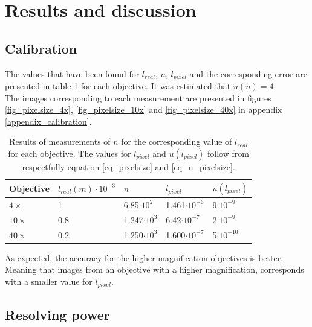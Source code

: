 \section{Results and discussion}
\subsection{Calibration}

The values that have been found for $l_{real}$, $n$, $l_{pixel}$ and the corresponding error are presented in table \ref{table_pixelsize} for each objective. It was estimated that $u(n) = 4$.\\
The images corresponding to each measurement are presented in figures \ref{fig_pixelsize_4x}, \ref{fig_pixelsize_10x} and \ref{fig_pixelsize_40x} in appendix \ref{appendix_calibration}.\\

\begin{table}[h!]
\centering
\captionsetup{font=small, justification = centering}
  \caption{Results of measurements of $n$ for the corresponding value of $l_{real}$ for each objective. The values for $l_{pixel}$ and $u(l_{pixel})$ follow from respectfully equation \ref{eq_pixelsize} and \ref{eq_u_pixelsize}.}
\begin{tabular}{|l|l|l|l|l|}
\hline

Objective & $l_{real} (m) \cdot 10^{-3}$ & $n$ & $l_{pixel}$ & $u(l_{pixel})$ \\ \hline
$4\times$ & 1 & 6.85$\cdot 10^2$ & 1.461$\cdot 10^{-6}$ & 9$\cdot 10^{-9}$\\
$10\times$ & 0.8 & 1.247$\cdot 10^3$ & 6.42$\cdot 10^{-7}$ & 2$\cdot 10^{-9}$ \\
$40\times$ & 0.2 & 1.250$\cdot 10^3$ & 1.600$\cdot 10^{-7}$ & 5$\cdot 10^{-10}$ \\ \hline
\end{tabular}

\label{table_pixelsize}
\end{table}
As expected, the accuracy for the higher magnification objectives is better. Meaning that images from an objective with a higher magnification, corresponds with a smaller value for $l_{pixel}$.\\

\bigskip

\subsection{Resolving power}

